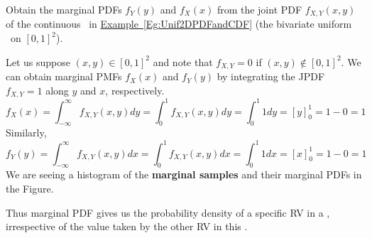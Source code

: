 \begin{example}\label{EgGetMarginalFromJointContUnif2DPDFandCDF}
Obtain the marginal PDFs $f_Y(y)$ and $f_X(x)$ from the joint PDF $f_{X,Y}(x,y)$ of the continuous \rv~in \hyperref[Eg:Unif2DPDFandCDF]{Example~\ref*{Eg:Unif2DPDFandCDF}} (the bivariate uniform \rv~on $[0,1]^2$).

\begin{center}
\end{center}

Let us suppose $(x,y) \in [0,1]^2$ and note that $f_{X,Y}=0$ if $(x,y) \notin [0,1]^2$.  
We can obtain marginal PMFs $f_X(x)$ and $f_Y(y)$ by integrating the JPDF $f_{X,Y}=1$ along $y$ and $x$, respectively.
\[
f_X(x) = \int_{-\infty}^{\infty} f_{X,Y}(x,y) dy = \int_{0}^{1} f_{X,Y}(x,y) dy 
= \int_{0}^{1} 1 dy = \left[ y \right]_0^1 = 1-0 = 1
\]
Similarly,
\[
f_Y(y) = \int_{-\infty}^{\infty} f_{X,Y}(x,y) dx = \int_{0}^{1} f_{X,Y}(x,y) dx 
= \int_{0}^{1} 1 dx = \left[ x \right]_0^1 = 1-0 = 1
\]
We are seeing a histogram of the {\bf marginal samples} and their marginal PDFs in the Figure.
\end{example}

Thus marginal PDF gives us the probability density of a specific RV in a \rv, irrespective of the value taken by the other RV in this \rv. 

